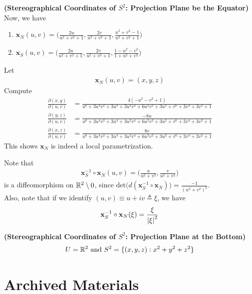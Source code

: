 \documentclass{report}
\begin{document}
\begin{mdframed}
\begin{Example}{\textbf{(Stereographical Coordinates of $S^2$: Projection Plane be the Equator)}}{}
Now, we have 
\begin{enumerate}[label=(\alph*)]
  \item $\textbf{x}_N(u,v)=\big(\frac{2u}{u^2+v^2+1},\frac{2v}{u^2+v^2+1},\frac{u^2+v^2-1}{u^2+v^2+1} \big)$
  \item $\textbf{x}_S(u,v)=\big(\frac{2u}{u^2+v^2+1},\frac{2v}{u^2+v^2+1},\frac{1-u^2-v^2}{1+u^2+v^2} \big)$
\end{enumerate}
Let
\begin{align*}
\textbf{x}_N(u,v)=(x,y,z)
\end{align*}
Compute 
\begin{align*}
  \frac{\partial (x,y)}{\partial (u,v)}&=\frac{4(-u^2 - v^2 + 1)}{u^6 + 3u^4v^2 + 3u^4 + 3u^2v^4 + 6u^2v^2 + 3u^2 + v^6 + 3v^4 + 3v^2 + 1}\\
  \frac{\partial (y,z)}{\partial (u,v)}&=\frac{-8u}{u^6 + 3u^4v^2 + 3u^4 + 3u^2v^4 + 6u^2v^2 + 3u^2 + v^6 + 3v^4 + 3v^2 + 1}\\
  \frac{\partial (x,z)}{\partial (u,v)}&=\frac{8v}{u^6 + 3u^4v^2 + 3u^4 + 3u^2v^4 + 6u^2v^2 + 3u^2 + v^6 + 3v^4 + 3v^2 + 1}
\end{align*}
This shows $\textbf{x}_N$ is indeed a local parametrization.   
\end{Example}
Note that 
\begin{align*}
\textbf{x}^{-1}_S \circ \textbf{x}_N (u,v)=\big( \frac{u}{u^2+v^2},\frac{v}{u^2+v^2}\big)
\end{align*}
is a diffeomorphism on $\mathbb{R}^2\setminus 0$, since $\text{det}\Big( d(\textbf{x}_S^{-1}\circ \textbf{x}_N)\Big)=\frac{-1}{(u^2+v^2)^2}$.\\

Also, note that if we identify $(u,v)\equiv u+iv\triangleq \xi$, we have 
\begin{align*}
\textbf{x}_S^{-1}\circ \textbf{x}_N (\xi)=\frac{\xi}{\left|\xi\right|^2}
\end{align*}
\end{mdframed}
\begin{mdframed}
\begin{Example}{\textbf{(Stereographical Coordinates of $S^2$: Projection Plane at the Bottom)}}{}
\begin{align*}
U=\mathbb{R}^2\text{ and }S^2=\{ (x,y,z):x^2+y^2+z^2 \}
\end{align*}
\end{Example}
\end{mdframed}

\chapter{Archived Materials}
\end{document}
